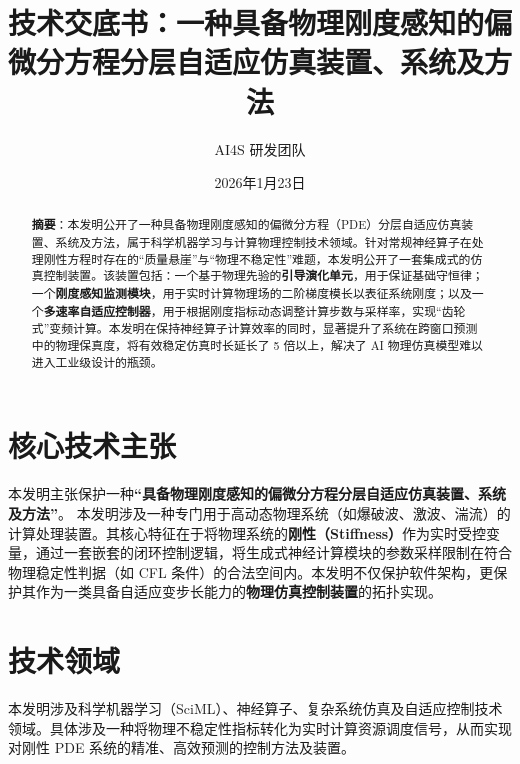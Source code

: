 \documentclass[UTF8, fontset=mac]{ctexart}
\title{\zihao{2}\heiti 技术交底书：一种具备物理刚度感知的偏微分方程分层自适应仿真装置、系统及方法}
\author{\zihao{4} AI4S 研发团队}
\date{2026年1月23日}
\begin{document}
\maketitle

\begin{abstract}
     \textbf{摘要}：本发明公开了一种具备物理刚度感知的偏微分方程（PDE）分层自适应仿真装置、系统及方法，属于科学机器学习与计算物理控制技术领域。针对常规神经算子在处理刚性方程时存在的“质量悬崖”与“物理不稳定性”难题，本发明公开了一套集成式的仿真控制装置。该装置包括：一个基于物理先验的\textbf{引导演化单元}，用于保证基础守恒律；一个\textbf{刚度感知监测模块}，用于实时计算物理场的二阶梯度模长以表征系统刚度；以及一个\textbf{多速率自适应控制器}，用于根据刚度指标动态调整计算步数与采样率，实现“齿轮式”变频计算。本发明在保持神经算子计算效率的同时，显著提升了系统在跨窗口预测中的物理保真度，将有效稳定仿真时长延长了 5 倍以上，解决了 AI 物理仿真模型难以进入工业级设计的瓶颈。
\end{abstract}

\section{核心技术主张}
本发明主张保护一种\textbf{“具备物理刚度感知的偏微分方程分层自适应仿真装置、系统及方法”}。
本发明涉及一种专门用于高动态物理系统（如爆破波、激波、湍流）的计算处理装置。其核心特征在于将物理系统的\textbf{刚性（Stiffness）}作为实时受控变量，通过一套嵌套的闭环控制逻辑，将生成式神经计算模块的参数采样限制在符合物理稳定性判据（如 CFL 条件）的合法空间内。本发明不仅保护软件架构，更保护其作为一类具备自适应变步长能力的\textbf{物理仿真控制装置}的拓扑实现。

\section{技术领域}
本发明涉及科学机器学习（SciML）、神经算子、复杂系统仿真及自适应控制技术领域。具体涉及一种将物理不稳定性指标转化为实时计算资源调度信号，从而实现对刚性 PDE 系统的精准、高效预测的控制方法及装置。
\end{document}
